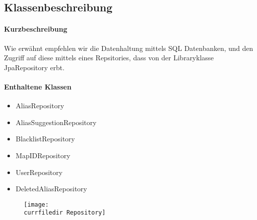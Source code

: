 \subsection*{Klassenbeschreibung}%
\paragraph*{Kurzbeschreibung}
Wie erwähnt empfehlen wir die Datenhaltung mittels SQL Datenbanken, und den Zugriff auf diese mittels eines Repsitories,
dass von der Libraryklasse \dq JpaRepository\dq{} erbt.

\paragraph*{Enthaltene Klassen}
\begin{itemize}
    \item AliasRepository
    \item AliasSuggestionRepository
    \item BlacklistRepository
    \item MapIDRepository
    \item UserRepository
    \item DeletedAliasRepository
\end{itemize}

\begin{figure}
    \centering
    \texttt{[image: \\currfiledir Repository]}
  \end{figure}